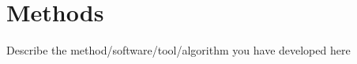 \section{Methods}\label{chap:methods}


Describe the method/software/tool/algorithm you have developed here